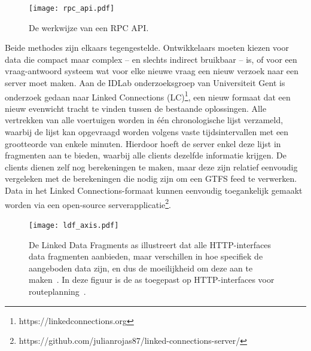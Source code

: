 \begin{figure}
	\centering
	\texttt{[image: rpc\_api.pdf]}
	\caption[RPC structuur]{De werkwijze van een RPC API.}
	\label{fig:rpcScheme}
\end{figure}

Beide methodes zijn elkaars tegengestelde. Ontwikkelaars moeten kiezen voor data die compact maar complex -- en slechts indirect bruikbaar -- is, of voor een vraag-antwoord systeem wat voor elke nieuwe vraag een nieuw verzoek naar een server moet maken. Aan de IDLab onderzoeksgroep van Universiteit Gent is onderzoek gedaan naar Linked Connections (LC)\footnote{https://linkedconnections.org}, een nieuw formaat dat een nieuw evenwicht tracht te vinden tussen de bestaande oplossingen. Alle vertrekken van alle voertuigen worden in één chronologische lijst verzameld, waarbij de lijst kan opgevraagd worden volgens vaste tijdsintervallen met een grootteorde van enkele minuten. Hierdoor hoeft de server enkel deze lijst in fragmenten aan te bieden, waarbij alle clients dezelfde informatie krijgen. De clients dienen zelf nog berekeningen te maken, maar deze zijn relatief eenvoudig vergeleken met de berekeningen die nodig zijn om een GTFS feed te verwerken. Data in het Linked Connections-formaat kunnen eenvoudig toegankelijk gemaakt worden via een open-source serverapplicatie\footnote{https://github.com/julianrojas87/linked-connections-server/}.

\begin{figure}
	\centering
		\texttt{[image: ldf\_axis.pdf]}
	\caption[Routeplanning HTTP-interfaces op de LDF as]{De Linked Data Fragments as illustreert dat alle HTTP-interfaces data fragmenten aanbieden, maar verschillen in hoe specifiek de aangeboden data zijn, en dus de moeilijkheid om deze aan te maken~\citep{verborgh14}. In deze figuur is de as toegepast op HTTP-interfaces voor routeplanning~\citep{colpaert15}.}
	\label{fig:ldfAxis}
\end{figure}

